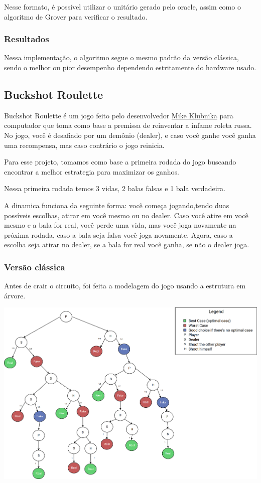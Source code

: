 \documentclass{article}
\begin{document}
Nesse formato, é possível utilizar o unitário gerado pelo oracle, assim como o algoritmo de Grover para verificar o resultado.

\subsubsection{Resultados}

Nessa implementação, o algoritmo segue o mesmo padrão da versão clássica, sendo o melhor ou pior desempenho dependendo estritamente do hardware usado.


\subsection{Buckshot Roulette}

Buckshot Roulette é um jogo feito pelo desenvolvedor \href{https://mikeklubnika.itch.io/}{Mike Klubnika} para computador que toma como base a premissa de reinventar a infame roleta russa. No jogo, você é desafiado por um demônio (dealer), e caso você ganhe você ganha uma recompensa, mas caso contrário o jogo reinicia.

Para esse projeto, tomamos como base a primeira rodada do jogo buscando encontrar a melhor estrategia para maximizar os ganhos.

Nessa primeira rodada temos 3 vidas, 2 balas falsas e 1 bala verdadeira.

A dinamica funciona da seguinte forma: você começa jogando,tendo duas possíveis escolhas, atirar em você mesmo ou no dealer. Caso você atire em você mesmo e a bala for real, você perde uma vida, mas você joga novamente na próxima rodada, caso a bala seja falsa você joga novamente. Agora, caso a escolha seja atirar no dealer, se a bala for real você ganha, se não o dealer joga.


\subsubsection{Versão clássica}

Antes de crair o circuito, foi feita a modelagem do jogo usando a estrutura em árvore.

\begin{center}
	\includegraphics[scale=0.2]{buckshot-roulette-diagram.png}
	\label{fig:classical-model-bckr}
\end{center}
\end{document}
